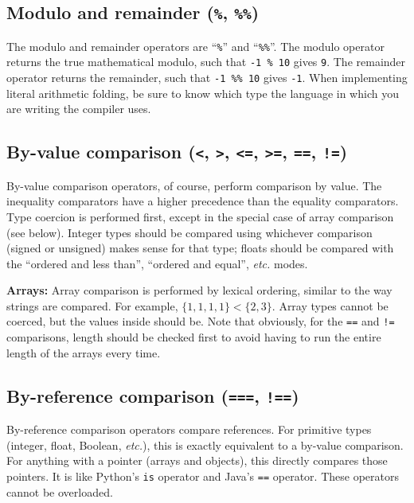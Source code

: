 \documentclass{article}
\begin{document}
\subsection{Modulo and remainder (\texttt{\%}, \texttt{\%\%})}
\label{sub:operators:modrem}
The modulo and remainder operators are ``\texttt{\%}'' and ``\texttt{\%\%}''.
The modulo operator returns the true mathematical modulo, such that
\texttt{-1~\%~10} gives \texttt{9}. The remainder operator returns the
remainder, such that \texttt{-1~\%\%~10} gives \texttt{-1}. When implementing
literal arithmetic folding, be sure to know which type the language in which
you are writing the compiler uses.

\subsection{By-value comparison (\texttt{<}, \texttt{>}, \texttt{<=},
  \texttt{>=}, \texttt{==}, \texttt{!=})}
\label{sub:operators:valcomp}
By-value comparison operators, of course, perform comparison by value. The
inequality comparators have a higher precedence than the equality
comparators. Type coercion is performed first, except in the special case of
array comparison (see below). Integer types should be compared using whichever
comparison (signed or unsigned) makes sense for that type; floats should be
compared with the ``ordered and less than'', ``ordered and equal'',
{\it etc.} modes.

\textbf{Arrays:} Array comparison is performed by lexical ordering, similar to
the way strings are compared. For example, $\{1, 1, 1, 1\} < \{2, 3\}$.
Array types cannot be coerced, but the values inside should be. Note that
obviously, for the \texttt{==} and \texttt{!=} comparisons, length should be
checked first to avoid having to run the entire length of the arrays every
time.

\subsection{By-reference comparison (\texttt{===}, \texttt{!==})}
\label{sub:operators:refcomp}
By-reference comparison operators compare references. For primitive types
(integer, float, Boolean, {\it etc.}), this is exactly equivalent to a
by-value comparison. For anything with a pointer (arrays and objects), this
directly compares those pointers. It is like Python's \texttt{is} operator
and Java's \texttt{==} operator. These operators cannot be overloaded.
\end{document}
